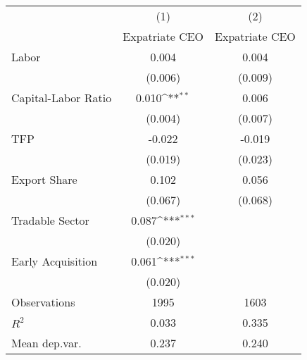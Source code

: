 {
\def\sym#1{\ifmmode^{#1}\else\(^{#1}\)\fi}
\begin{tabular}{l*{2}{c}}
\hline\hline
                    &\multicolumn{1}{c}{(1)}&\multicolumn{1}{c}{(2)}\\
                    &\multicolumn{1}{c}{Expatriate CEO}&\multicolumn{1}{c}{Expatriate CEO}\\
\hline
Labor               &       0.004         &       0.004         \\
                    &     (0.006)         &     (0.009)         \\
[1em]
Capital-Labor Ratio &       0.010\sym{**} &       0.006         \\
                    &     (0.004)         &     (0.007)         \\
[1em]
TFP                 &      -0.022         &      -0.019         \\
                    &     (0.019)         &     (0.023)         \\
[1em]
Export Share        &       0.102         &       0.056         \\
                    &     (0.067)         &     (0.068)         \\
[1em]
Tradable Sector     &       0.087\sym{***}&                     \\
                    &     (0.020)         &                     \\
[1em]
Early Acquisition   &       0.061\sym{***}&                     \\
                    &     (0.020)         &                     \\
\hline
Observations        &        1995         &        1603         \\
\(R^{2}\)           &       0.033         &       0.335         \\
Mean dep.var.       &       0.237         &       0.240         \\
\hline\hline
\end{tabular}
}
